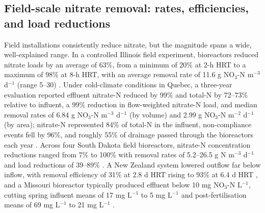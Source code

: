 \documentclass[11pt]{article}
\begin{document}
\subsection{Field-scale nitrate removal: rates, efficiencies, and load reductions}

Field installations consistently reduce nitrate, but the magnitude spans a wide, well-explained range. In a controlled Illinois field experiment, bioreactors reduced nitrate loads by an average of 63\%, from a minimum of 20\% at 2-h HRT to a maximum of 98\% at 8-h HRT, with an average removal rate of 11.6 g NO$_3$-N m$^{-3}$ d$^{-1}$ (range 5--30) \parencite{Bell2015}. Under cold-climate conditions in Quebec, a three-year evaluation reported effluent nitrate-N reduced by 99\% and total-N by 72--73\% relative to influent, a 99\% reduction in flow-weighted nitrate-N load, and median removal rates of 6.84 g NO$_3$-N m$^{-3}$ d$^{-1}$ (by volume) and 2.99 g NO$_3$-N m$^{-2}$ d$^{-1}$ (by area); nitrate-N represented 84\% of total-N in the influent, non-compliance events fell by 96\%, and roughly 55\% of drainage passed through the bioreactors each year \parencite{Husk2017}. Across four South Dakota field bioreactors, nitrate-N concentration reductions ranged from 7\% to 100\% with removal rates of 5.2--26.5 g N m$^{-3}$ d$^{-1}$ and load reductions of 39--89\% \parencite{Thapa2023}. A New Zealand system lowered outflow far below inflow, with removal efficiency of 31\% at 2.8 d HRT rising to 93\% at 6.4 d HRT \parencite{Rivas2020}, and a Missouri bioreactor typically produced effluent below 10 mg NO$_3$-N L$^{-1}$, cutting spring influent means of 17 mg L$^{-1}$ to 5 mg L$^{-1}$ and post-fertilisation means of 69 mg L$^{-1}$ to 21 mg L$^{-1}$ \parencite{Aide2016}.
\end{document}
